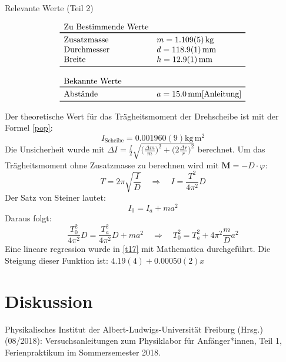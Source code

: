 \documentclass[11pt,a4paper]{article}
\renewcommand{\vec}{\boldsymbol}
\begin{document}
\begin{table}[ht]
\caption{Relevante Werte (Teil 2)}
$$
\begin{array}{ll}
	\multicolumn{1}{l}{\textrm{Zu Bestimmende Werte}} \\
	\toprule 
	\textrm{Zusatzmasse} & m = 1.109(5)\,\textrm{kg} \\
	\textrm{Durchmesser} & d = 118.9(1)\,\textrm{mm} \\
	\textrm{Breite} & h = 12.9(1)\,\textrm{mm} \\
	\bottomrule \\
	\multicolumn{2}{l}{\textrm{Bekannte Werte}} \\
	\toprule
	\textrm{Abstände} & a = 15.0\,\textrm{mm}\cite{Anleitung}\\
	\bottomrule 
\end{array}
$$
\end{table}

Der theoretische Wert für das Trägheitsmoment der Drehscheibe ist mit der Formel \ref{pop}:
$$I_{\textrm{Scheibe}} = 0.001960(9)\textrm{kg}\,\textrm{m}^2$$
Die Unsicherheit wurde mit $\Delta I = \frac{I}{2}\sqrt{\bigg(\frac{\Delta m}{m}\bigg)^2 + \bigg(2\frac{\Delta r}{r}\bigg)^2}$ berechnet. 
Um das Trägheitsmoment ohne Zusatzmasse zu berechnen wird mit $\vec M = -D\cdot \varphi$:
$$T = 2\pi \sqrt{\frac{I}{D}}\quad \Rightarrow \quad I = \frac{T^2}{4\pi^2}D$$
Der Satz von Steiner lautet:
$$I_0 = I_a + ma^2$$
Daraus folgt:
$$\frac{T_0^2}{4\pi^2}D = \frac{T_a^2}{4\pi^2}D + ma^2 \quad \Rightarrow \quad T_0^2 = T_a^2 + 4\pi^2 \frac{m}{D}a^2$$
Eine lineare regression wurde in \ref{t17} mit Mathematica durchgeführt. Die Steigung dieser Funktion ist: $4.19(4) + 0.00050(2) x$ 



\section{Diskussion}

\vfill

\begin{thebibliography}{9}
  Physikalisches Institut der Albert-Ludwigs-Universität Freiburg (Hrsg.) (08/2018): Versuchsanleitungen zum Physiklabor für Anfänger*innen, Teil 1, Ferienpraktikum im Sommersemester 2018.
 \end{thebibliography}
\end{document}
